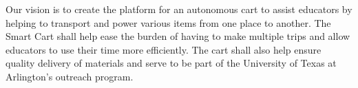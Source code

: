 Our vision is to create the platform for an autonomous cart to assist educators by helping to transport and power various items from one place to another. The Smart Cart shall help ease the burden of having to make multiple trips and allow educators to use their time more efficiently. The cart shall also help ensure quality delivery of materials and serve to be part of the University of Texas at Arlington’s outreach program.
